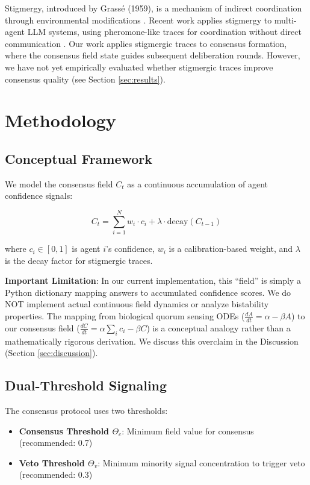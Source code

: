 \documentclass[11pt,letterpaper]{article}
\begin{document}
Stigmergy, introduced by Grass{\'e} (1959), is a mechanism of indirect coordination through environmental modifications \cite{Grasse1959}. Recent work applies stigmergy to multi-agent LLM systems, using pheromone-like traces for coordination without direct communication \cite{Stigmergy2025}. Our work applies stigmergic traces to consensus formation, where the consensus field state guides subsequent deliberation rounds. However, we have not yet empirically evaluated whether stigmergic traces improve consensus quality (see Section \ref{sec:results}).

\section{Methodology}
\label{sec:methodology}

\subsection{Conceptual Framework}

We model the consensus field $C_t$ as a continuous accumulation of agent confidence signals:

\begin{equation}
C_t = \sum_{i=1}^{N} w_i \cdot c_i + \lambda \cdot \text{decay}(C_{t-1})
\end{equation}

where $c_i \in [0,1]$ is agent $i$'s confidence, $w_i$ is a calibration-based weight, and $\lambda$ is the decay factor for stigmergic traces.

\textbf{Important Limitation}: In our current implementation, this ``field'' is simply a Python dictionary mapping answers to accumulated confidence scores. We do NOT implement actual continuous field dynamics or analyze bistability properties. The mapping from biological quorum sensing ODEs ($\frac{dA}{dt} = \alpha - \beta A$) to our consensus field ($\frac{dC}{dt} = \alpha \sum_i c_i - \beta C$) is a conceptual analogy rather than a mathematically rigorous derivation. We discuss this overclaim in the Discussion (Section \ref{sec:discussion}).

\subsection{Dual-Threshold Signaling}

The consensus protocol uses two thresholds:

\begin{itemize}
\item \textbf{Consensus Threshold $\Theta_c$}: Minimum field value for consensus (recommended: 0.7)
\item \textbf{Veto Threshold $\Theta_v$}: Minimum minority signal concentration to trigger veto (recommended: 0.3)
\end{itemize}
\end{document}
